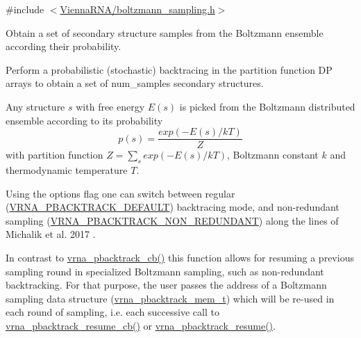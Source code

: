 {\ttfamily \#include $<$\mbox{\hyperlink{boltzmann__sampling_8h}{Vienna\+R\+N\+A/boltzmann\+\_\+sampling.\+h}}$>$}



Obtain a set of secondary structure samples from the Boltzmann ensemble according their probability. 

Perform a probabilistic (stochastic) backtracing in the partition function DP arrays to obtain a set of {\ttfamily num\+\_\+samples} secondary structures.

Any structure $ s $ with free energy $ E(s) $ is picked from the Boltzmann distributed ensemble according to its probability \[ p(s) = \frac{exp(-E(s) / kT)}{Z} \] with partition function $ Z = \sum_s exp(-E(s) / kT) $, Boltzmann constant $ k $ and thermodynamic temperature $ T $.

Using the {\ttfamily options} flag one can switch between regular (\mbox{\hyperlink{group__subopt__stochbt_ga760aa2fb2d5e3d7521a11454a21e9b9f}{V\+R\+N\+A\+\_\+\+P\+B\+A\+C\+K\+T\+R\+A\+C\+K\+\_\+\+D\+E\+F\+A\+U\+LT}}) backtracing mode, and non-\/redundant sampling (\mbox{\hyperlink{group__subopt__stochbt_ga9d580ce645aa0c38b69afdf56c332200}{V\+R\+N\+A\+\_\+\+P\+B\+A\+C\+K\+T\+R\+A\+C\+K\+\_\+\+N\+O\+N\+\_\+\+R\+E\+D\+U\+N\+D\+A\+NT}}) along the lines of Michalik et al. 2017 \cite{michalik:2017}.

In contrast to \mbox{\hyperlink{group__subopt__stochbt_ga843fa953a15337b15cc68401adad84d7}{vrna\+\_\+pbacktrack\+\_\+cb()}} this function allows for resuming a previous sampling round in specialized Boltzmann sampling, such as non-\/redundant backtracking. For that purpose, the user passes the address of a Boltzmann sampling data structure (\mbox{\hyperlink{group__subopt__stochbt_gaa59c30efbed96bf9aaf8005584c72e63}{vrna\+\_\+pbacktrack\+\_\+mem\+\_\+t}}) which will be re-\/used in each round of sampling, i.\+e. each successive call to \mbox{\hyperlink{group__subopt__stochbt_ga6fc5ce952995e53baef52cad5581c063}{vrna\+\_\+pbacktrack\+\_\+resume\+\_\+cb()}} or \mbox{\hyperlink{group__subopt__stochbt_gae175129ece546fe7c092f27072e039d1}{vrna\+\_\+pbacktrack\+\_\+resume()}}.

